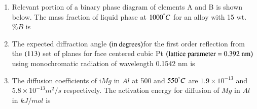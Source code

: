 \documentclass[journal,12pt,onecolumn]{IEEEtran}
\theoremstyle{remark}
\begin{document}
\begin{enumerate}
\begin{multicols}{2}
        \end{multicols}
        \begin{multicols}{2}
            \begin{enumerate}
                \item[R.]  $GaAs$ \columnbreak
                \item[3.] High temperature superconductor
            \end{enumerate}

        \end{multicols}
        \begin{multicols}{2}
            \begin{enumerate}
                \item[S.] $YBa_2Cu_3O_7$\columnbreak
                \item[4.]  Optoelectronic semiconductor 
            \end{enumerate}

        \end{multicols}


        \hfill{}
        \begin{enumerate}
        \end{enumerate}

        \hfill{}

    \item Relevant portion of a binary phase diagram of elements A and B is shown below. The mass fraction
        of liquid phase at $1000 ^ {\degree}C$ for an alloy with 15 wt.$\% B$ is
        \hfill{}
        \begin{center}
            \resizebox{0.5\textwidth}{!}{%
                           
                }%
        \end{center}
    \item The expected diffraction angle $\left(\textnormal{in degrees}\right)$for the first order reflection from the $\left(113\right)$ set of planes
        for face centered cubic Pt $\left(\textnormal{lattice parameter = 0.392 nm}\right)$ using monochromatic radiation of
        wavelength 0.1542 nm is
        \hfill{}
    \item The diffusion coefficients of i$Mg$ in $Al$ at 500 and $550^{\degree}C$ are $1.9\times 10^{-13}$
        and $5.8\times 10^{-13} m^2/s$ respectively. The activation energy for diffusion of $Mg$ in $Al$ in $kJ/mol$ is
        \hfill{}
\end{enumerate}
\end{document}
